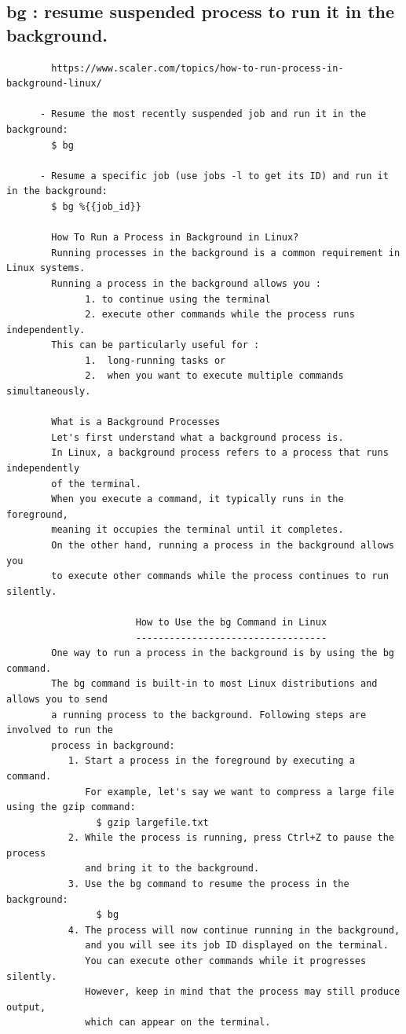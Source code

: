 \documentclass[a4paper,12pt]{article}
\begin{document}
\subsection{bg   : resume suspended process to run it in the background.  }
\begin{verbatim}
        https://www.scaler.com/topics/how-to-run-process-in-background-linux/

      - Resume the most recently suspended job and run it in the background:
        $ bg

      - Resume a specific job (use jobs -l to get its ID) and run it in the background:
        $ bg %{{job_id}}

        How To Run a Process in Background in Linux?
        Running processes in the background is a common requirement in Linux systems. 
        Running a process in the background allows you : 
              1. to continue using the terminal 
              2. execute other commands while the process runs independently. 
        This can be particularly useful for : 
              1.  long-running tasks or 
              2.  when you want to execute multiple commands simultaneously.

        What is a Background Processes
        Let's first understand what a background process is.
        In Linux, a background process refers to a process that runs independently
        of the terminal. 
        When you execute a command, it typically runs in the foreground, 
        meaning it occupies the terminal until it completes. 
        On the other hand, running a process in the background allows you 
        to execute other commands while the process continues to run silently. 

                       How to Use the bg Command in Linux
                       ----------------------------------
        One way to run a process in the background is by using the bg command.
        The bg command is built-in to most Linux distributions and allows you to send
        a running process to the background. Following steps are involved to run the 
        process in background:
           1. Start a process in the foreground by executing a command. 
              For example, let's say we want to compress a large file using the gzip command:
                $ gzip largefile.txt
           2. While the process is running, press Ctrl+Z to pause the process 
              and bring it to the background.
           3. Use the bg command to resume the process in the background:
                $ bg
           4. The process will now continue running in the background, 
              and you will see its job ID displayed on the terminal. 
              You can execute other commands while it progresses silently. 
              However, keep in mind that the process may still produce output, 
              which can appear on the terminal.

\end{verbatim}
\end{document}
